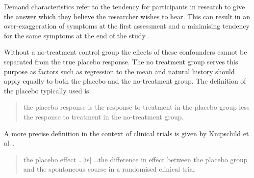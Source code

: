 Demand characteristics \cite{Fernandez1994,weber1972subject} refer to the tendency for participants in research to give the answer which they believe the researcher wishes to hear. This can result in an over-exaggeration of symptoms at the first assessment and a minimising tendency for the same symptoms at the end of the study \cite{Vase2005}.  






Without a no-treatment control group the effects of these confounders cannot be separated from the true placebo response.  The no treatment group serves this purpose as factors such as regression to the mean and natural history should apply equally to both the placebo and the no-treatment group.  The definition of the placebo typically used is:
\begin{quotation}
 the placebo response is the response to treatment in the placebo group less the response to treatment in the no-treatment group.  
\end{quotation}

A more precise definition in the context of clinical trials is given by Knipschild et al~\cite{Knipschild2005}. 

\begin{quote}
   the placebo effect \ldots [is] \ldots the difference in effect between the placebo group and the spontaneous course in a randomised clinical trial 
\end{quote}



